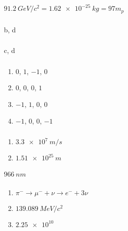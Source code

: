 \documentclass{article}
\begin{document}
\setcounter{subsubsection}{18}
\subsubsection{}

$\qty{91.2}{GeV/c^2} = \qty{1.62e-25}{kg} = 97 m_p$

\setcounter{subsubsection}{22}
\subsubsection{}

b, d

\setcounter{subsubsection}{24}
\subsubsection{}

c, d

\setcounter{subsubsection}{26}
\subsubsection{}

\begin{enumerate}
  \item $0$, $1$, $-1$, $0$

  \item $0$, $0$, $0$, $1$

  \item $-1$, $1$, $0$, $0$

  \item $-1$, $0$, $0$, $-1$
\end{enumerate}

\setcounter{subsubsection}{30}
\subsubsection{}

\begin{enumerate}
  \item $\qty{3.3e7}{m/s}$

  \item $\qty{1.51e25}{m}$
\end{enumerate}

\setcounter{subsubsection}{36}
\subsubsection{}

$\qty{966}{nm}$

\setcounter{subsubsection}{38}
\subsubsection{}

\begin{enumerate}
  \item $\pi^- \rightarrow \mu^- + \nu \rightarrow e^- + 3 \nu$

  \item $\qty{139.089}{MeV/c^2}$

  \item $\num{2.25e10}$
\end{enumerate}
\end{document}
